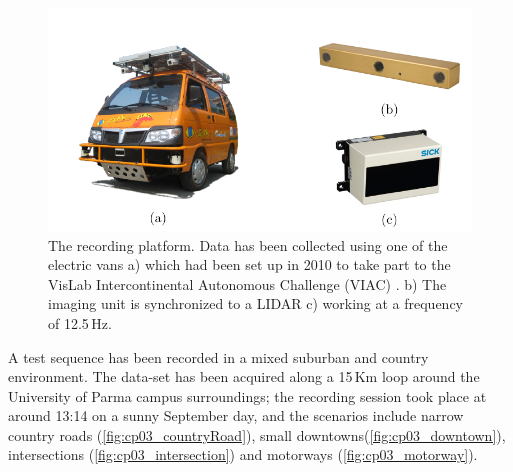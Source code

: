 \begin{figure}[h]
      \centering
      \includegraphics[width=\textwidth, trim=0 0 0 40,clip]{viac}
      \caption{ The recording platform. Data has been collected using one of the electric vans a) which had been set up in 2010 to take part to the VisLab Intercontinental Autonomous Challenge (VIAC) \citep{Broggi2010VIAC}. b) The imaging unit  is synchronized to a LIDAR c) working at a frequency of 12.5\,Hz. }      
      \label{fig:cp03_VIAC}
\end{figure}

A test sequence has been recorded in a mixed suburban and country environment. The data-set has been acquired along a 15\,Km loop around the University of Parma campus surroundings; the recording session took place at around 13:14 on a sunny September day, and the scenarios include narrow country roads (\ref{fig:cp03_countryRoad}), small downtowns(\ref{fig:cp03_downtown}), intersections (\ref{fig:cp03_intersection}) and motorways (\ref{fig:cp03_motorway}).

